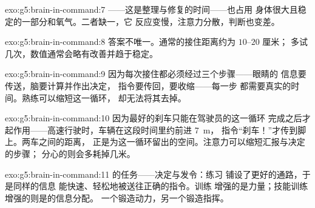 \begin{solution}{exo:g5:brain-in-command:7}
——这是整理与修复的时间——也占用
身体很大且稳定的一部分和氧气。二者缺一，它
反应变慢，注意力分散，判断也变差。
\end{solution}

\begin{solution}{exo:g5:brain-in-command:8}
答案不唯一。通常的接住距离约为 $10$--$20$ 厘米；
多试几次，数值通常会略有改善并趋于稳定。
\end{solution}

\begin{solution}{exo:g5:brain-in-command:9}
因为每次接住都必须经过三个步骤——眼睛的
信息要传送，脑要计算并作出决定，
指令要传回，要收缩——每一步
都需要真实的时间。熟练可以缩短这一循环，
却无法将其去掉。
\end{solution}

\begin{solution}{exo:g5:brain-in-command:10}
因为最好的刹车只能在驾驶员的这一循环
完成之后才起作用——高速行驶时，车辆在这段时间里约前进 \qty{7}{m}，
指令“刹车！”才传到脚上。两车之间的距离，
正是为这一循环留出的空间。注意力可以缩短汇报与决定的步骤；
分心的则会多耗掉几米。
\end{solution}

\begin{solution}{exo:g5:brain-in-command:11}
的任务——决定与发令：练习
铺设了更好的通路，于是同样的信息
能快速、轻松地被送往正确的指令。训练
增强的是力量；技能训练增强的则是的信息分配。
一个锻造动力，另一个锻造指挥。
\end{solution}
